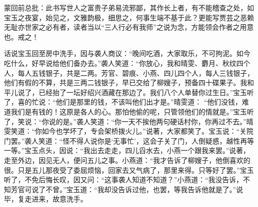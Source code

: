 \begin{parag}
    \begin{note}蒙回前总批：此书写世人之富贵子弟易流邪鄙，其作长上者，有不能稽查之处，如宝玉之夜宴，始见之，文雅韵极，细思之，何事生端不基于此？更能写贾芸之恶赖无耻亦世家之必有者，读者当以“三人行必有我师”之说为念，方能领会作者之用意也。戒之！\end{note}
\end{parag}


\begin{parag}
    话说宝玉回至房中洗手，因与袭人商议：“晚间吃酒，大家取乐，不可拘泥。如今吃什么，好早说给他们备办去。”袭人笑道：“你放心，我和晴雯、麝月、秋纹四个人，每人五钱银子，共是二两。芳官、碧痕、小燕、四儿四个人，每人三钱银子，他们有假的不算，共是三两二钱银子，早已交给了柳嫂子，预备四十碟果子。我和平儿说了，已经抬了一坛好绍兴酒藏在那边了。我们八个人单替你过生日。”宝玉听了，喜的忙说：“他们是那里的钱，不该叫他们出才是。”晴雯道： “他们没钱，难道我们是有钱的！这原是各人的心。那怕他偷的呢，只管领他们的情就是。”宝玉听了，笑说：“你说的是。”袭人笑道：“你一天不挨他两句硬话村你，你再过不去。”晴雯笑道：“你如今也学坏了，专会架桥拨火儿。”说著，大家都笑了。宝玉说：“关院门罢。”袭人笑道：“怪不得人说你是‘无事忙’，这会子关了门，人倒疑惑，越性再等一等。”宝玉点头，因说：“我出去走走，四儿舀水去，小燕一个跟我来罢。”说著，走至外边，因见无人，便问五儿之事。小燕道：“我才告诉了柳嫂子，他倒喜欢的很。只是五儿那夜受了委屈烦恼，回家去又气病了，那里来得。只等好了罢。”宝玉听了，不免后悔长叹，因又问：“这事袭人知道不知道？”小燕道：“我没告诉，不知芳官可说了不曾。”宝玉道：“我却没告诉过他，也罢，等我告诉他就是了。”说毕，复走进来，故意洗手。
\end{parag}


